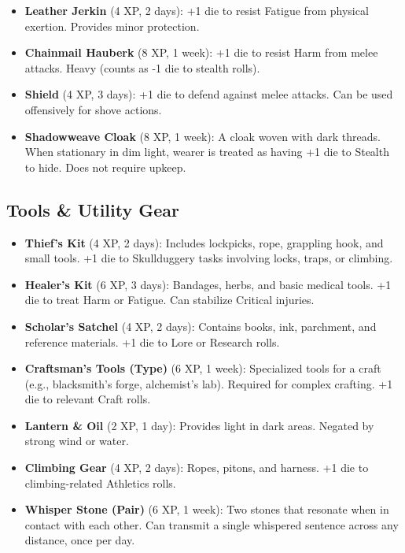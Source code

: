 \documentclass[12pt]{article}
\begin{document}
\begin{itemize}[leftmargin=*]
  \item \textbf{Leather Jerkin} (4 XP, 2 days): +1 die to resist Fatigue from physical exertion. Provides minor protection.
  \item \textbf{Chainmail Hauberk} (8 XP, 1 week): +1 die to resist Harm from melee attacks. Heavy (counts as -1 die to stealth rolls).
  \item \textbf{Shield} (4 XP, 3 days): +1 die to defend against melee attacks. Can be used offensively for shove actions.
  \item \textbf{Shadowweave Cloak} (8 XP, 1 week): A cloak woven with dark threads. When stationary in dim light, wearer is treated as having +1 die to Stealth to hide. Does not require upkeep.
\end{itemize}

\subsection*{Tools \& Utility Gear}

\begin{itemize}[leftmargin=*]
  \item \textbf{Thief's Kit} (4 XP, 2 days): Includes lockpicks, rope, grappling hook, and small tools. +1 die to Skullduggery tasks involving locks, traps, or climbing.
  \item \textbf{Healer's Kit} (6 XP, 3 days): Bandages, herbs, and basic medical tools. +1 die to treat Harm or Fatigue. Can stabilize Critical injuries.
  \item \textbf{Scholar's Satchel} (4 XP, 2 days): Contains books, ink, parchment, and reference materials. +1 die to Lore or Research rolls.
  \item \textbf{Craftsman's Tools (Type)} (6 XP, 1 week): Specialized tools for a craft (e.g., blacksmith's forge, alchemist's lab). Required for complex crafting. +1 die to relevant Craft rolls.
  \item \textbf{Lantern \& Oil} (2 XP, 1 day): Provides light in dark areas. Negated by strong wind or water.
  \item \textbf{Climbing Gear} (4 XP, 2 days): Ropes, pitons, and harness. +1 die to climbing-related Athletics rolls.
  \item \textbf{Whisper Stone (Pair)} (6 XP, 1 week): Two stones that resonate when in contact with each other. Can transmit a single whispered sentence across any distance, once per day.
\end{itemize}
\end{document}
